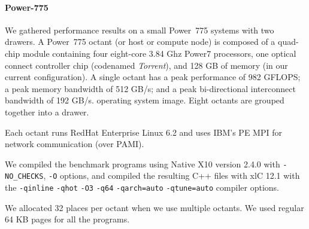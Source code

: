 \paragraph{Power-775}
We gathered performance results on a small Power~775 systems with two drawers.
A Power~775 octant (or host or compute node) is composed of a quad-chip module
containing four eight-core 3.84 Ghz Power7 processors, one optical
connect controller chip (codenamed {\em Torrent}), and 128 GB of
memory (in our current configuration). A single octant has a peak performance of 982 GFLOPS; a peak
memory bandwidth of 512 GB/s; and a peak bi-directional interconnect
bandwidth of 192 GB/s. %
operating system image. Eight octants are grouped together into a drawer.

Each octant runs RedHat Enterprise Linux 6.2 and uses IBM's PE MPI for network communication (over PAMI).  

We compiled the benchmark programs using Native X10 version 2.4.0 with \texttt{-NO\_CHECKS}, \texttt{-O} options, and compiled the resulting
C++ files with xlC 12.1 with the \texttt{-qinline} \texttt{-qhot} \texttt{-O3}
\texttt{-q64} \texttt{-qarch=auto} \texttt{-qtune=auto} compiler options.

We allocated 32 places per octant when we use multiple octants.
We used regular 64 KB pages for all the programs.
